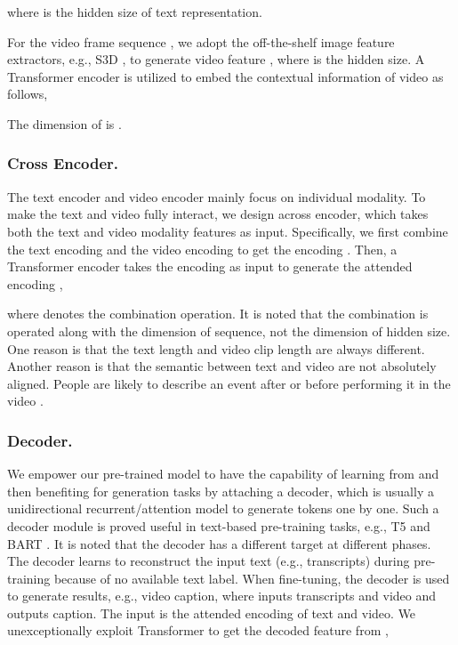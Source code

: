 \documentclass[11pt,a4paper]{article}
\begin{document}
	where  is the hidden size of text representation. 
	
	For the video frame sequence , we adopt the off-the-shelf image feature extractors, e.g., S3D \cite{Xie2018Rethinking}, to generate video feature , where  is the hidden size. A Transformer encoder is utilized to embed the contextual information of video as follows,
	
	The dimension of  is .
	
	\subsubsection{Cross Encoder.} The text encoder and video encoder mainly focus on individual modality. To make the text and video fully interact, we design across encoder, which takes both the text and video modality features as input. Specifically, we first combine the text encoding  and the video encoding  to get the encoding . Then, a Transformer encoder takes the encoding  as input to generate the attended encoding , 
	
	where  denotes the combination operation. It is noted that the combination is operated along with the dimension of sequence, not the dimension of hidden size. One reason is that the text length  and video clip length  are always different. Another reason is that the semantic between text and video are not absolutely aligned. People are likely to describe an event after or before performing it in the video \cite{miech19endtoend}.
	
	\subsubsection{Decoder.} We empower our pre-trained model to have the capability of learning from and then benefiting for generation tasks by attaching a decoder, which is usually a unidirectional recurrent/attention model to generate tokens one by one. Such a decoder module is proved useful in text-based pre-training tasks, e.g., T5 \cite{2019t5} and BART \cite{lewis-etal-2020-bart}. It is noted that the decoder has a different target at different phases. The decoder learns to reconstruct the input text (e.g., transcripts) during pre-training because of no available text label. When fine-tuning, the decoder is used to generate results, e.g., video caption, where inputs transcripts and video and outputs caption. The input is the attended encoding  of text and video. We unexceptionally exploit Transformer to get the decoded feature  from ,
	
\end{document}
